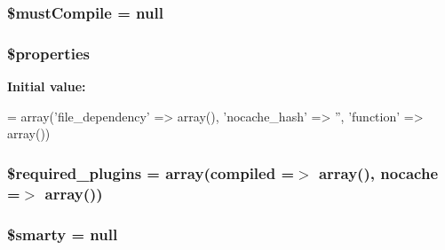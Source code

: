 \subsubsection[{\$must\+Compile}]{\setlength{\rightskip}{0pt plus 5cm}\${\bf must\+Compile} = null}\label{class_smarty___internal___template_a9faa5e2c2d86463859252cc6962ed9a0}
\hypertarget{class_smarty___internal___template_a7f675de4b5983d7e84f6573b7d4d453d}{}
\subsubsection[{\$properties}]{\setlength{\rightskip}{0pt plus 5cm}\$properties}\label{class_smarty___internal___template_a7f675de4b5983d7e84f6573b7d4d453d}
{\bfseries Initial value\+:}
\begin{DoxyCode}
= array(\textcolor{stringliteral}{'file\_dependency'} => array(),
        \textcolor{stringliteral}{'nocache\_hash'} => \textcolor{stringliteral}{''},
        \textcolor{stringliteral}{'function'} => array())
\end{DoxyCode}
\hypertarget{class_smarty___internal___template_a32340eba5b892ce9cf8c124940a6621e}{}
\subsubsection[{\$required\+\_\+plugins}]{\setlength{\rightskip}{0pt plus 5cm}\$required\+\_\+plugins = array(\textquotesingle{}compiled\textquotesingle{} =$>$ array(), \textquotesingle{}nocache\textquotesingle{} =$>$ array())}\label{class_smarty___internal___template_a32340eba5b892ce9cf8c124940a6621e}
\hypertarget{class_smarty___internal___template_ac3ae29e9ccbb2006fa26fd9eb2c12117}{}
\subsubsection[{\$smarty}]{\setlength{\rightskip}{0pt plus 5cm}\$smarty = null}\label{class_smarty___internal___template_ac3ae29e9ccbb2006fa26fd9eb2c12117}
\hypertarget{class_smarty___internal___template_a93dbc9fc2973c09e307929d7cce4dff3}{}
